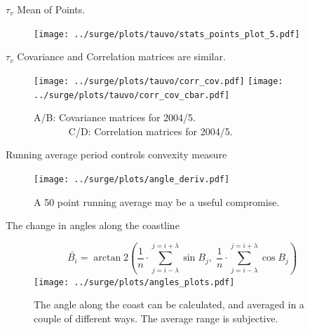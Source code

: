\documentclass[usenames, dvipsnames]{beamer}
\begin{document}
\begin{frame}{$\tau_v$ Mean of Points. }
\vspace{-20pt}
\begin{figure}[htb!]
    \centering
    \texttt{[image: ../surge/plots/tauvo/stats\_points\_plot\_5.pdf]}
    \vspace{-7pt}
    \caption{}
    \label{fig:A}
\end{figure}
\end{frame}


\begin{frame}{$\tau_v$ Covariance and Correlation matrices are similar.  }
\vspace{-20pt}
\begin{figure}[htb!]
    \centering
    \hspace{-10pt}
    \texttt{[image: ../surge/plots/tauvo/corr\_cov.pdf]}
    \texttt{[image: ../surge/plots/tauvo/corr\_cov\_cbar.pdf]}
    \vspace{-7pt}
    \caption{A/B: Covariance matrices for 2004/5.\\
            $\quad\quad\quad\;\;$C/D: Correlation matrices for 2004/5.}
    \label{fig:}
\end{figure}
\end{frame}

\begin{frame}{Running average period controls convexity measure }
\vspace{-20pt}
\begin{figure}[htb!]
    \centering
    \texttt{[image: ../surge/plots/angle\_deriv.pdf]}
    \caption{A 50 point running average may be a useful compromise. }
\end{figure}
\end{frame}


\begin{frame}{The change in angles along the coastline}
\vspace{-20pt}
\begin{figure}[htb!]
    \centering
    \begin{equation}
\bar{B_i}=\operatorname{arctan} 2\left(\frac{1}{n} \cdot
\sum_{j=i-\lambda}^{j=i+\lambda}  \sin B_{j},\; \frac{1}{n}
 \cdot \sum_{j=i-\lambda}^{j=i+\lambda} \cos B_{j}\right)
\end{equation}
    \texttt{[image: ../surge/plots/angles\_plots.pdf]}
    \caption{The angle along the coast can be calculated, and averaged in a couple
     of different ways. The average range is subjective.}
\end{figure}
\end{frame}
\end{document}
